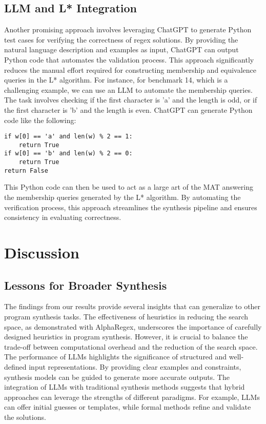 \subsection{LLM and L* Integration}
\indent\indent Another promising approach involves leveraging ChatGPT to generate Python test cases for verifying the correctness of regex solutions. By providing the natural language description and examples as input, ChatGPT can output Python code that automates the validation process. This approach significantly reduces the manual effort required for constructing membership and equivalence queries in the L* algorithm.
\indent\indent For instance, for benchmark 14, which is a challenging example, we can use an LLM to automate the membership queries. The task involves checking if the first character is 'a' and the length is odd, or if the first character is 'b' and the length is even. ChatGPT can generate Python code like the following:

\begin{verbatim}
if w[0] == 'a' and len(w) % 2 == 1:
	return True
if w[0] == 'b' and len(w) % 2 == 0:
	return True
return False
\end{verbatim}

\indent\indent This Python code can then be used to act as a large art of the MAT answering the membership queries generated by the L* algorithm. By automating the verification process, this approach streamlines the synthesis pipeline and ensures consistency in evaluating correctness.

\section{Discussion}

\subsection{Lessons for Broader Synthesis}
\indent\indent The findings from our results provide several insights that can generalize to other program synthesis tasks. The effectiveness of heuristics in reducing the search space, as demonstrated with AlphaRegex, underscores the importance of carefully designed heuristics in program synthesis. However, it is crucial to balance the trade-off between computational overhead and the reduction of the search space. The performance of LLMs highlights the significance of structured and well-defined input representations. By providing clear examples and constraints, synthesis models can be guided to generate more accurate outputs. The integration of LLMs with traditional synthesis methods suggests that hybrid approaches can leverage the strengths of different paradigms. For example, LLMs can offer initial guesses or templates, while formal methods refine and validate the solutions.

